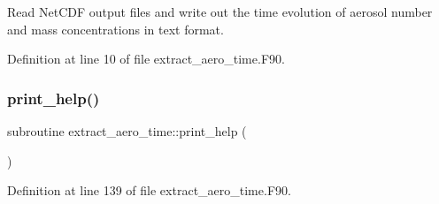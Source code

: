 Read Net\+C\+DF output files and write out the time evolution of aerosol number and mass concentrations in text format. 



Definition at line 10 of file extract\+\_\+aero\+\_\+time.\+F90.

\mbox{\label{extract__aero__time_8_f90_a591247c9ca9dc6ed7df9d6453cfbe8a2}} 
\subsubsection{\texorpdfstring{print\+\_\+help()}{print\_help()}}
{\footnotesize\ttfamily subroutine extract\+\_\+aero\+\_\+time\+::print\+\_\+help (\begin{DoxyParamCaption}{ }\end{DoxyParamCaption})}



Definition at line 139 of file extract\+\_\+aero\+\_\+time.\+F90.

